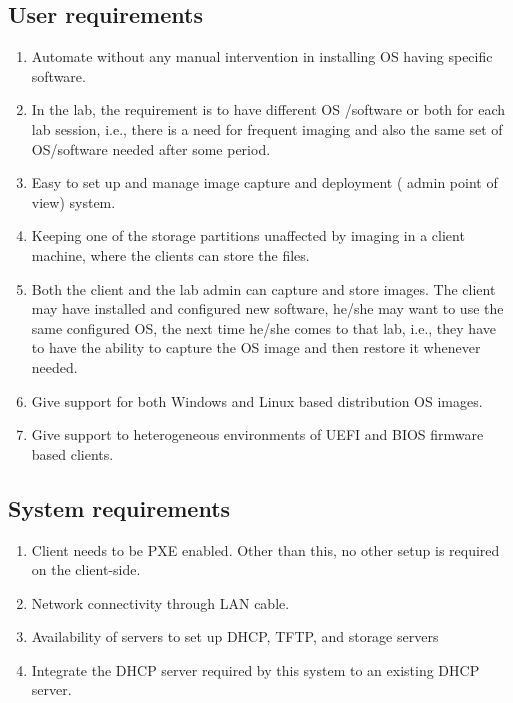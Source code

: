 \documentclass[a4paper,12pt]{article}
\begin{document}
\subsection{User requirements}
\begin{enumerate}
\item Automate without any manual intervention in installing OS having specific software.
\item In the lab, the requirement is to have different OS  /software or both for each lab session, i.e., there is a need for frequent imaging and also the same set of OS/software needed after some period.
\item Easy to set up and manage image capture and deployment ( admin point of view) system.
\item Keeping one of the storage partitions unaffected by imaging in a client machine, where the clients can store the files.
\item Both the client and the lab admin can capture and store images. The client may have installed and configured new software, he/she may want to use the same configured OS, the next time he/she comes to that lab, i.e., they have to have the ability to capture the OS image and then restore it whenever needed.
\item Give support for both Windows and Linux based distribution OS images.
\item Give support to heterogeneous environments of UEFI and BIOS firmware based clients.
\end{enumerate}
\subsection{System requirements}
\begin{enumerate}
\item Client needs to be PXE enabled. Other than this, no other setup is required on the client-side.
\item Network connectivity through LAN cable.
\item Availability of servers to set up DHCP, TFTP, and storage servers
\item Integrate the DHCP server required by this system to an existing DHCP server.
\end{enumerate}
\end{document}
